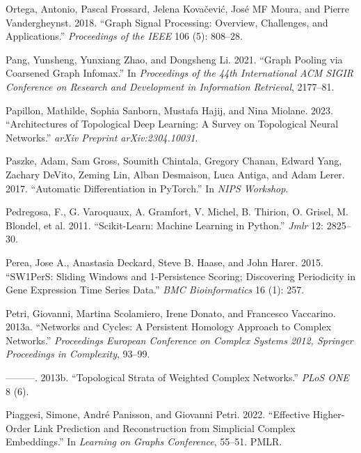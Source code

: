 \documentclass[
  12pt,
]{krantz}
\newlength{\cslhangindent}
\newenvironment{CSLReferences}[2] %
 {\begin{list}{}{%
  \setlength{\itemindent}{0pt}
  \setlength{\leftmargin}{0pt}
  \setlength{\parsep}{0pt}
  \ifodd #1
   \setlength{\leftmargin}{\cslhangindent}
   \setlength{\itemindent}{-1\cslhangindent}
  \fi
  \setlength{\itemsep}{#2\baselineskip}}}
 {\end{list}}
\begin{document}
\begin{CSLReferences}{1}{0}
Ortega, Antonio, Pascal Frossard, Jelena Kovačević, José MF Moura, and
Pierre Vandergheynst. 2018. {``Graph Signal Processing: Overview,
Challenges, and Applications.''} \emph{Proceedings of the IEEE} 106 (5):
808--28.

Pang, Yunsheng, Yunxiang Zhao, and Dongsheng Li. 2021. {``Graph Pooling
via Coarsened Graph Infomax.''} In \emph{Proceedings of the 44th
International ACM SIGIR Conference on Research and Development in
Information Retrieval}, 2177--81.

Papillon, Mathilde, Sophia Sanborn, Mustafa Hajij, and Nina Miolane.
2023. {``Architectures of Topological Deep Learning: A Survey on
Topological Neural Networks.''} \emph{arXiv Preprint arXiv:2304.10031}.

Paszke, Adam, Sam Gross, Soumith Chintala, Gregory Chanan, Edward Yang,
Zachary DeVito, Zeming Lin, Alban Desmaison, Luca Antiga, and Adam
Lerer. 2017. {``Automatic Differentiation in {P}y{T}orch.''} In
\emph{NIPS Workshop}.

Pedregosa, F., G. Varoquaux, A. Gramfort, V. Michel, B. Thirion, O.
Grisel, M. Blondel, et al. 2011. {``Scikit-Learn: Machine Learning in
{P}ython.''} \emph{Jmlr} 12: 2825--30.

Perea, Jose A., Anastasia Deckard, Steve B. Haase, and John Harer. 2015.
{``{SW}1{P}er{S}: Sliding Windows and 1-Persistence Scoring; Discovering
Periodicity in Gene Expression Time Series Data.''} \emph{BMC
Bioinformatics} 16 (1): 257.

Petri, Giovanni, Martina Scolamiero, Irene Donato, and Francesco
Vaccarino. 2013a. {``Networks and Cycles: A Persistent Homology Approach
to Complex Networks.''} \emph{Proceedings European Conference on Complex
Systems 2012, Springer Proceedings in Complexity}, 93--99.

---------. 2013b. {``Topological Strata of Weighted Complex Networks.''}
\emph{PLoS ONE} 8 (6).

Piaggesi, Simone, André Panisson, and Giovanni Petri. 2022. {``Effective
Higher-Order Link Prediction and Reconstruction from Simplicial Complex
Embeddings.''} In \emph{Learning on Graphs Conference}, 55--51. PMLR.


\end{CSLReferences}
\end{document}
